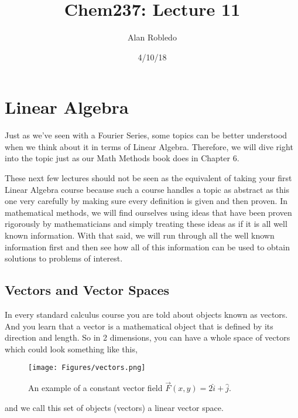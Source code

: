 \documentclass{article}
\title{Chem237: Lecture 11}
\date{4/10/18}
\author{Alan Robledo}
\begin{document}
\maketitle
\section*{Linear Algebra}
Just as we've seen with a Fourier Series, some topics can be better understood when we think about it in terms of Linear Algebra.
Therefore, we will dive right into the topic just as our Math Methods book does in Chapter 6.

These next few lectures should not be seen as the equivalent of taking your first Linear Algebra course because such a course handles a topic as abstract as this one very carefully by making sure every definition is given and then proven.
In mathematical methods, we will find ourselves using ideas that have been proven rigorously by mathematicians and simply treating these ideas as if it is all well known information.
With that said, we will run through all the well known information first and then see how all of this information can be used to obtain solutions to problems of interest.

\subsection*{Vectors and Vector Spaces}
In every standard calculus course you are told about objects known as vectors.
And you learn that a vector is a mathematical object that is defined by its direction and length.
So in 2 dimensions, you can have a whole space of vectors which could look something like this,
\begin{figure}[H]
  \centering
  \texttt{[image: Figures/vectors.png]}
    \caption{An example of a constant vector field $\vec{F}(x,y) = 2 \hat{i} + \hat{j}$.}
  \label{fig:vectorspace}
\end{figure}
\noindent
and we call this set of objects (vectors) a linear vector space.
\end{document}
